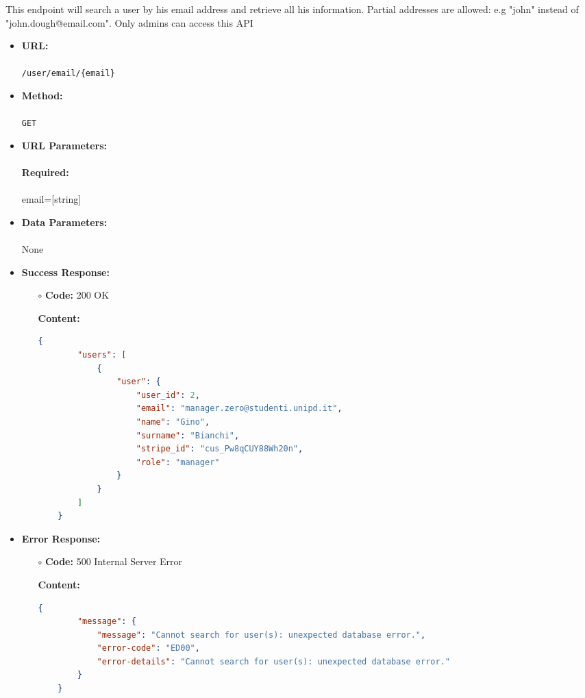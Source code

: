 

This endpoint will search a user by his email address and retrieve all his information. Partial addresses are allowed: e.g "john" instead of "john.dough@email.com".  Only admins can access this API

\begin{itemize}
	\item \textbf{URL:} \\\\\texttt{/user/email/\{email\}}
	\item \textbf{Method:} \\\\\texttt{GET}
	\item \textbf{URL Parameters:}\\\\
	\textbf{Required:}\\\\
	email=[string]
	\item \textbf{Data Parameters:} \\\\None
	\item \textbf{Success Response:}
	\begin{itemize}
		\item[$\circ$] \textbf{Code:} 200 OK
		\item[] \textbf{Content:}
		\begin{lstlisting}[language=json]
    {
        "users": [
            {
                "user": {
                    "user_id": 2,
                    "email": "manager.zero@studenti.unipd.it",
                    "name": "Gino",
                    "surname": "Bianchi",
                    "stripe_id": "cus_Pw8qCUY88Wh20n",
                    "role": "manager"
                }
            }
        ]
    }
		\end{lstlisting}
	\end{itemize}
	
	
    \item \textbf{Error Response:}
    	\begin{itemize}
			\item[$\circ$] \textbf{Code:} 500 Internal Server Error
			\item[] \textbf{Content:}
			\begin{lstlisting}[language=json]
	{
		"message": {
			"message": "Cannot search for user(s): unexpected database error.",
			"error-code": "ED00",
			"error-details": "Cannot search for user(s): unexpected database error."
		}
	}
			\end{lstlisting}
		\end{itemize}


\end{itemize}
